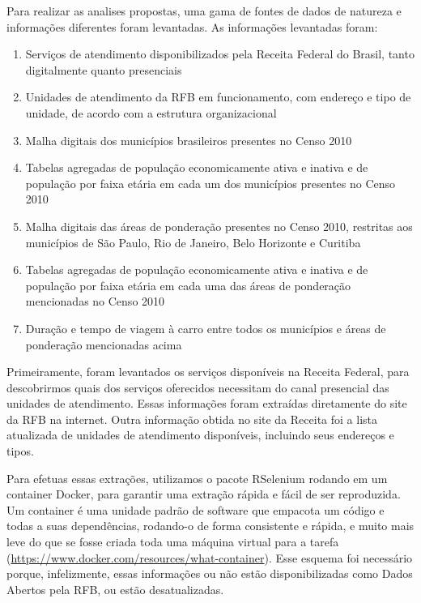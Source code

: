 \documentclass[]{article}
\providecommand{\tightlist}{%
  \setlength{\itemsep}{0pt}\setlength{\parskip}{0pt}}
\begin{document}
Para realizar as analises propostas, uma gama de fontes de dados de
natureza e informações diferentes foram levantadas. As informações
levantadas foram:

\begin{enumerate}
\def\labelenumi{\arabic{enumi}.}
\tightlist
\item
  Serviços de atendimento disponibilizados pela Receita Federal do
  Brasil, tanto digitalmente quanto presenciais
\item
  Unidades de atendimento da RFB em funcionamento, com endereço e tipo
  de unidade, de acordo com a estrutura organizacional
\item
  Malha digitais dos municípios brasileiros presentes no Censo 2010
\item
  Tabelas agregadas de população economicamente ativa e inativa e de
  população por faixa etária em cada um dos municípios presentes no
  Censo 2010
\item
  Malha digitais das áreas de ponderação presentes no Censo 2010,
  restritas aos municípios de São Paulo, Rio de Janeiro, Belo Horizonte
  e Curitiba
\item
  Tabelas agregadas de população economicamente ativa e inativa e de
  população por faixa etária em cada uma das áreas de ponderação
  mencionadas no Censo 2010
\item
  Duração e tempo de viagem à carro entre todos os municípios e áreas de
  ponderação mencionadas acima
\end{enumerate}

Primeiramente, foram levantados os serviços disponíveis na Receita
Federal, para descobrirmos quais dos serviços oferecidos necessitam do
canal presencial das unidades de atendimento. Essas informações foram
extraídas diretamente do site da RFB na internet. Outra informação
obtida no site da Receita foi a lista atualizada de unidades de
atendimento disponíveis, incluindo seus endereços e tipos.

Para efetuas essas extrações, utilizamos o pacote RSelenium rodando em
um container Docker, para garantir uma extração rápida e fácil de ser
reproduzida. Um container é uma unidade padrão de software que empacota
um código e todas a suas dependências, rodando-o de forma consistente e
rápida, e muito mais leve do que se fosse criada toda uma máquina
virtual para a tarefa
(\url{https://www.docker.com/resources/what-container}). Esse esquema
foi necessário porque, infelizmente, essas informações ou não estão
disponibilizadas como Dados Abertos pela RFB, ou estão desatualizadas.
\end{document}
